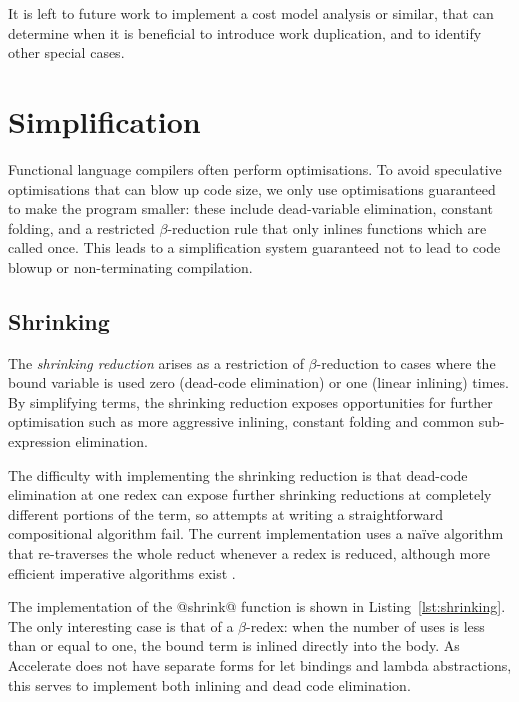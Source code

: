 It is left to future work to implement a cost model analysis or similar, that
can determine when it is beneficial to introduce work duplication, and to
identify other special cases.

\section{Simplification}
\label{sec:simplification}

Functional language compilers often perform optimisations. To avoid speculative
optimisations that can blow up code size, we only use optimisations guaranteed
to make the program smaller: these include dead-variable elimination, constant
folding, and a restricted $\beta$-reduction rule that only inlines functions
which are called once. This leads to a simplification system guaranteed not to
lead to code blowup or non-terminating compilation.

\subsection{Shrinking}
\label{sec:shrinking}

The \emph{shrinking reduction} arises as a restriction of $\beta$-reduction to
cases where the bound variable is used zero (dead-code elimination) or one
(linear inlining) times. By simplifying terms,
the shrinking reduction exposes opportunities for further optimisation such as
more aggressive inlining, constant folding and common sub-expression
elimination. %

The difficulty with implementing the shrinking reduction is that dead-code
elimination at one redex can expose further shrinking reductions at completely
different portions of the term, so attempts at writing a straightforward
compositional algorithm fail. The current implementation uses a na\"ive
algorithm that re-traverses the whole reduct whenever a redex is reduced,
although more efficient imperative algorithms exist
\cite{Appel:1997gs,Benton:2004ua,Kennedy:2007cb}.

The implementation of the @shrink@ function is shown in
Listing~\ref{lst:shrinking}. The only interesting case is that of a
$\beta$-redex: when the number of uses is less than or equal to one, the bound
term is inlined directly into the body. As Accelerate does not have separate
forms for let bindings and lambda abstractions, this serves to implement both
inlining and dead code elimination.

